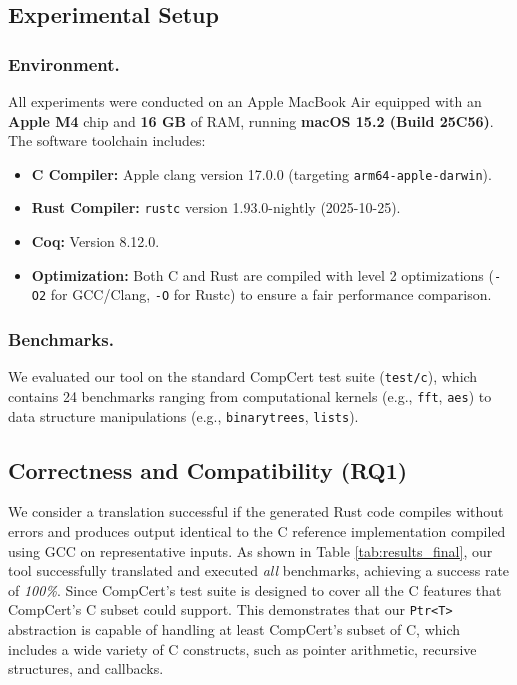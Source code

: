 \documentclass{llncs} %
\begin{document}
\subsection{Experimental Setup}

\subsubsection{Environment.}
All experiments were conducted on an Apple MacBook Air equipped with an \textbf{Apple M4} chip and \textbf{16 GB} of RAM, running \textbf{macOS 15.2 (Build 25C56)}. The software toolchain includes:
\begin{itemize}
    \item \textbf{C Compiler:} Apple clang version 17.0.0 (targeting \texttt{arm64-apple-darwin}).
    \item \textbf{Rust Compiler:} \texttt{rustc} version 1.93.0-nightly (2025-10-25).
    \item \textbf{Coq:} Version 8.12.0.
    \item \textbf{Optimization:} Both C and Rust are compiled with level 2 optimizations (\texttt{-O2} for GCC/Clang, \texttt{-O} for Rustc) to ensure a fair performance comparison.
\end{itemize}

\subsubsection{Benchmarks.}
We evaluated our tool on the standard CompCert test suite (\texttt{test/c}), which contains 24 benchmarks ranging from computational kernels (e.g., \texttt{fft}, \texttt{aes}) to data structure manipulations (e.g., \texttt{binarytrees}, \texttt{lists}). 

\subsection{Correctness and Compatibility (RQ1)}

We consider a translation successful if the generated Rust code compiles without errors and produces output identical to the C reference implementation compiled using GCC on representative inputs.
As shown in Table \ref{tab:results_final}, our tool successfully translated and executed \emph{all} benchmarks, achieving a success rate of \emph{100\%}. Since CompCert's test suite is designed to cover all the C features that CompCert's C subset could support. This demonstrates that our \texttt{Ptr<T>} abstraction is capable of handling at least CompCert's subset of C, which includes a wide variety of C constructs, such as pointer arithmetic, recursive structures, and callbacks.
\end{document}
